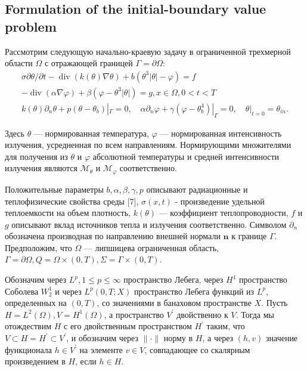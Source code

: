 \subsection{Formulation of the initial-boundary value problem}\label{subsec:ch3:sec1:subsec2}

Рассмотрим следующую начально-краевую задачу
в ограниченной трехмерной области $\Omega$ с
отражающей границей $\Gamma=\partial \Omega$:
\[
    \begin{gathered}
        \sigma \partial \theta / \partial t-\operatorname{div}(k(\theta) \nabla \theta)
        +b\left(\theta^{3}|\theta|-\varphi\right)=f \\
        -\operatorname{div}(\alpha \nabla \varphi)+
        \beta\left(\varphi-\theta^{3}|\theta|\right)=g, x \in \Omega, 0<t<T \\
        k(\theta) \partial_{n} \theta + p\left(\theta-\theta_{b}\right)|_{\Gamma}=0,
        \quad \alpha \partial_{n} \varphi
        + \gamma\left(\varphi-\theta_{b}^{4}\right)|_{\Gamma}=0,
        \quad \theta|_{t=0}=\theta_{i n}.
    \end{gathered}
\]


Здесь $\theta$ — нормированная температура, $\varphi$ — нормированная интенсивность излучения,
усредненная по всем направлениям.
Нормирующими множителями для получения из
$\theta$ и $\varphi$ абсолютной температуры и средней интенсивности излучения
являются $\mathcal{M}_{\theta}$ и $\mathcal{M}_{\varphi}$ соответственно.


Положительные параметры $b, \alpha, \beta, \gamma, p$ описывают радиационные
и теплофизические свойства среды [7], $\sigma(x, t)$ - произведение
удельной теплоемкости на объем плотность, $k(\theta)$ — коэффициент теплопроводности,
$f$ и $g$ описывают вклад источников тепла и излучения соответственно.
Символом $\partial_{n}$ обозначена производная по направлению внешней
нормали $\mathbf{n}$ к границе $\Gamma$.
Предположим,
что $\Omega$ — липшицева ограниченная область,
$\Gamma=\partial \Omega, Q=\Omega \times(0, T), \Sigma=\Gamma \times(0, T)$.


Обозначим через $L^{p}, 1 \leq p \leq \infty$ пространство Лебега, через $H^{1}$
пространство Соболева $W_{2}^{1}$ и через $L^ {p}(0, T ; X)$ пространство
Лебега функций из $L^{p}$, определенных на $(0, T)$, со значениями в банаховом пространстве $X$.
Пусть $H=L^{2}(\Omega), V=H^{1}(\Omega)$, а пространство $V^{\prime}$ двойственно к $V$.
Тогда мы отождествим $H$ с его двойственным пространством $H^{\prime}$ таким,
что $V \subset H=H^{\prime} \subset V^{\prime}$, и обозначим через $\|\cdot \|$ норму в $H$,
а через $(h, v)$ значение функционала $h \in V^{\prime}$ на элементе $v \in V$,
совпадающее со скалярным произведением в $ H$, если $h \in H$.


